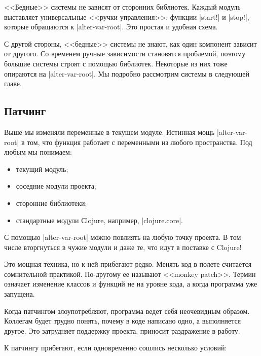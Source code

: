 <<Бедные>> системы не зависят от сторонних библиотек. Каждый модуль выставляет
универсальные <<ручки управления>>: функции \spverb|start!| и \spverb|stop!|,
которые обращаются к \spverb|alter-var-root|. Это простая и удобная схема.

С другой стороны, <<бедные>> системы не знают, как один компонент зависит от
другого. Со временем ручные зависимости становятся проблемой, поэтому большие
системы строят с помощью библиотек. Некоторые из них тоже опираются на
\spverb|alter-var-root|. Мы подробно рассмотрим системы в следующей главе.


\subsection{Патчинг}

Выше мы изменяли переменные в текущем модуле. Истинная мощь
\spverb|alter-var-root| в том, что функция работает с переменными из любого
пространства. Под любым мы понимаем:

\begin{itemize}

\item
  текущий модуль;

\item
  соседние модули проекта;

\item
  сторонние библиотеки;

\item
  стандартные модули Сlojure, например, \spverb|clojure.core|.

\end{itemize}

С помощью \spverb|alter-var-root| можно повлиять на любую точку проекта. В том
числе вторгнуться в чужие модули и даже те, что идут в поставке с Clojure!

Это мощная техника, но к ней прибегают редко. Менять код в полете считается
сомнительной практикой. По-другому ее называют <<monkey patch>>. Термин означает
изменение классов и функций не на уровне кода, а когда программа уже запущена.

Когда патчингом злоупотребляют, программа ведет себя неочевидным
образом. Коллегам будет трудно понять, почему в коде написано одно, а
выполняется другое. Это затрудняет поддержку проекта, приносит раздражение в
работу.

К патчингу прибегают, если одновременно сошлись несколько условий:


